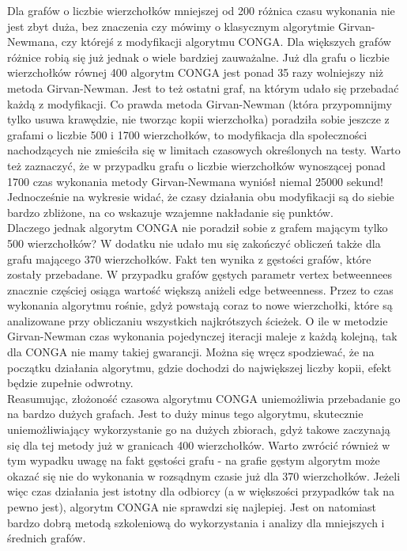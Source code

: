 \documentclass{article}
\begin{document}
Dla grafów o liczbie wierzchołków mniejszej od 200 różnica czasu wykonania nie jest zbyt duża, bez znaczenia czy mówimy o klasycznym algorytmie Girvan-Newmana, czy którejś z modyfikacji algorytmu CONGA. Dla większych grafów różnice robią się już jednak o wiele bardziej zauważalne. Już dla grafu o liczbie wierzchołków równej 400 algorytm CONGA jest ponad 35 razy wolniejszy niż metoda Girvan-Newman. Jest to też ostatni graf, na którym udało się przebadać każdą z modyfikacji. Co prawda metoda Girvan-Newman (która przypomnijmy tylko usuwa krawędzie, nie tworząc kopii wierzchołka) poradziła sobie jeszcze z grafami o liczbie 500 i 1700 wierzchołków, to modyfikacja dla społeczności nachodzących nie zmieściła się w limitach czasowych określonych na testy. Warto też zaznaczyć, że w przypadku grafu o liczbie wierzchołków wynoszącej ponad 1700 czas wykonania metody Girvan-Newmana wyniósł niemal 25000 sekund! Jednocześnie na wykresie widać, że czasy działania obu modyfikacji są do siebie bardzo zbliżone, na co wskazuje wzajemne nakładanie się punktów. \\

Dlaczego jednak algorytm CONGA nie poradził sobie z grafem mającym tylko 500 wierzchołków? W dodatku nie udało mu się zakończyć obliczeń także dla grafu mającego 370 wierzchołków. Fakt ten wynika z gęstości grafów, które zostały przebadane. W przypadku grafów gęstych parametr vertex betweennees znacznie częściej osiąga wartość większą aniżeli edge betweenness. Przez to czas wykonania algorytmu rośnie, gdyż powstają coraz to nowe wierzchołki, które są analizowane przy obliczaniu wszystkich najkrótszych ścieżek. O ile w metodzie Girvan-Newman czas wykonania pojedynczej iteracji maleje z każdą kolejną, tak dla CONGA nie mamy takiej gwarancji. Można się wręcz spodziewać, że na początku działania algorytmu, gdzie dochodzi do największej liczby kopii, efekt będzie zupełnie odwrotny. \\

Reasumując, złożoność czasowa algorytmu CONGA uniemożliwia przebadanie go na bardzo dużych grafach. Jest to duży minus tego algorytmu, skutecznie uniemożliwiający wykorzystanie go na dużych zbiorach, gdyż takowe zaczynają się dla tej metody już w granicach 400 wierzchołków. Warto zwrócić również w tym wypadku uwagę na fakt gęstości grafu - na grafie gęstym algorytm może okazać się nie do wykonania w rozsądnym czasie już dla 370 wierzchołków. Jeżeli więc czas działania jest istotny dla odbiorcy (a w większości przypadków tak na pewno jest), algorytm CONGA nie sprawdzi się najlepiej. Jest on natomiast bardzo dobrą metodą szkoleniową do wykorzystania i analizy dla mniejszych i średnich grafów. \\
\end{document}
